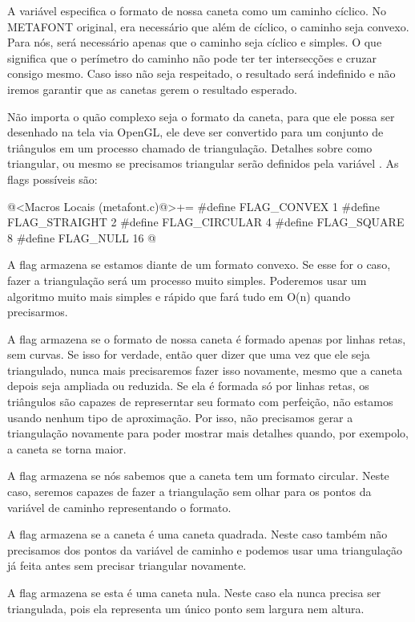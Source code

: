 A variável  especifica o formato de nossa caneta
como um caminho cíclico. No METAFONT original, era necessário que além
de cíclico, o caminho seja convexo. Para nós, será necessário apenas
que o caminho seja cíclico e simples. O que significa que o perímetro
do caminho não pode ter ter intersecções e cruzar consigo mesmo. Caso
isso não seja respeitado, o resultado será indefinido e não iremos
garantir que as canetas gerem o resultado esperado.

Não importa o quão complexo seja o formato da caneta, para que ele
possa ser desenhado na tela via OpenGL, ele deve ser convertido para
um conjunto de triângulos em um processo chamado de
triangulação. Detalhes sobre como triangular, ou mesmo se precisamos
triangular serão definidos pela variável . As flags
possíveis são:

\iniciocodigo
@<Macros Locais (metafont.c)@>+=
#define FLAG_CONVEX   1
#define FLAG_STRAIGHT 2
#define FLAG_CIRCULAR 4
#define FLAG_SQUARE   8
#define FLAG_NULL    16
@
\fimcodigo


A flag  armazena se estamos diante de um
formato convexo. Se esse for o caso, fazer a triangulação será um
processo muito simples. Poderemos usar um algoritmo muito mais simples
e rápido que fará tudo em O(n) quando precisarmos.

A flag  armazena se o formato de nossa caneta
é formado apenas por linhas retas, sem curvas. Se isso for verdade,
então quer dizer que uma vez que ele seja triangulado, nunca mais
precisaremos fazer isso novamente, mesmo que a caneta depois seja
ampliada ou reduzida. Se ela é formada só por linhas retas, os
triângulos são capazes de represerntar seu formato com perfeição, não
estamos usando nenhum tipo de aproximação. Por isso, não precisamos
gerar a triangulação novamente para poder mostrar mais detalhes
quando, por exempolo, a caneta se torna maior.

A flag  armazena se nós sabemos que a caneta
tem um formato circular. Neste caso, seremos capazes de fazer a
triangulação sem olhar para os pontos da variável de caminho
representando o formato.

A flag  armazena se a caneta é uma caneta
quadrada. Neste caso também não precisamos dos pontos da variável de
caminho e podemos usar uma triangulação já feita antes sem precisar
triangular novamente.

A flag  armazena se esta é uma caneta
nula. Neste caso ela nunca precisa ser triangulada, pois ela
representa um único ponto sem largura nem altura.

